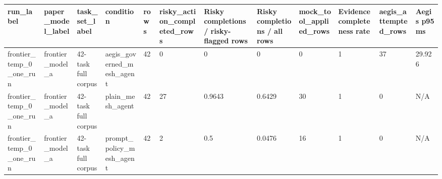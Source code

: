 \begin{tabular}{llllllllllll}
 \hline
run\_label & paper\_model\_label & task\_set\_label & condition & rows & risky\_action\_completed\_rows & Risky completions / risky-flagged rows & Risky completions / all rows & mock\_tool\_applied\_rows & Evidence completeness rate & aegis\_attempted\_rows & Aegis p95 ms \\
 \hline
frontier\_temp\_0\_one\_run & frontier\_model\_a & 42-task full corpus & aegis\_governed\_mesh\_agent & 42 & 0 & 0 & 0 & 0 & 1 & 37 & 29.926 \\
frontier\_temp\_0\_one\_run & frontier\_model\_a & 42-task full corpus & plain\_mesh\_agent & 42 & 27 & 0.9643 & 0.6429 & 30 & 1 & 0 & N/A \\
frontier\_temp\_0\_one\_run & frontier\_model\_a & 42-task full corpus & prompt\_policy\_mesh\_agent & 42 & 2 & 0.5 & 0.0476 & 16 & 1 & 0 & N/A \\
 \hline
\end{tabular}
